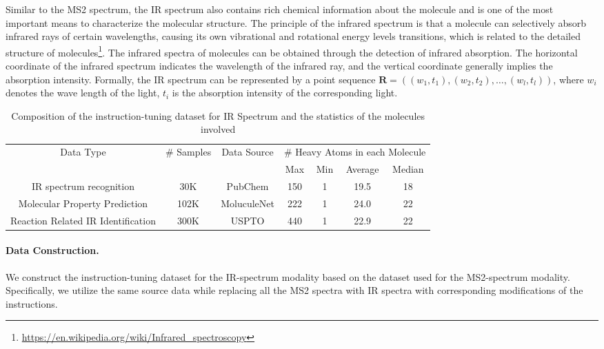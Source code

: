 Similar to the MS2 spectrum, the IR spectrum also contains rich chemical information about the molecule and is one of the most important means to characterize the molecular structure. The principle of the infrared spectrum is that a molecule can selectively absorb infrared rays of certain wavelengths, causing its own vibrational and rotational energy levels transitions, which is related to the detailed structure of molecules\footnote{\url{https://en.wikipedia.org/wiki/Infrared_spectroscopy}}. The infrared spectra of molecules can be obtained through the detection of infrared absorption. The horizontal coordinate of the infrared spectrum indicates the wavelength of the infrared ray, and the vertical coordinate generally implies the absorption intensity. Formally, the IR spectrum can be represented by a point sequence $\mathbf{R} = ((w_1, t_1), (w_2, t_2), \dots, (w_l, t_l))$, where $w_i$ denotes the wave length of the light, $t_i$ is the absorption intensity of the corresponding light.

\begin{table}
    \centering
    \begin{tabular}{ccccccc}
    \toprule
        \multirow{2}{*}{Data Type} & \multirow{2}{*}{\# Samples} & \multirow{2}{*}{Data Source} & \multicolumn{4}{c}{\# Heavy Atoms in each Molecule} \\
        & & & Max & Min & Average & Median \\
    \midrule
        IR spectrum recognition & 30K & PubChem & 150 & 1 & 19.5 & 18\\
        Molecular Property Prediction & 102K & MoluculeNet & 222 & 1 & 24.0 & 22\\
        Reaction Related IR Identification & 300K & USPTO & 440 & 1 & 22.9 & 22\\
    \bottomrule
    \end{tabular}
    \caption{Composition of the instruction-tuning dataset for IR Spectrum and the statistics of the molecules involved}
    \label{tab:datair}
\end{table}

\paragraph{Data Construction.} We construct the instruction-tuning dataset for the IR-spectrum modality based on the dataset used for the MS2-spectrum modality. Specifically, we utilize the same source data while replacing all the MS2 spectra with IR spectra with corresponding modifications of the instructions.

